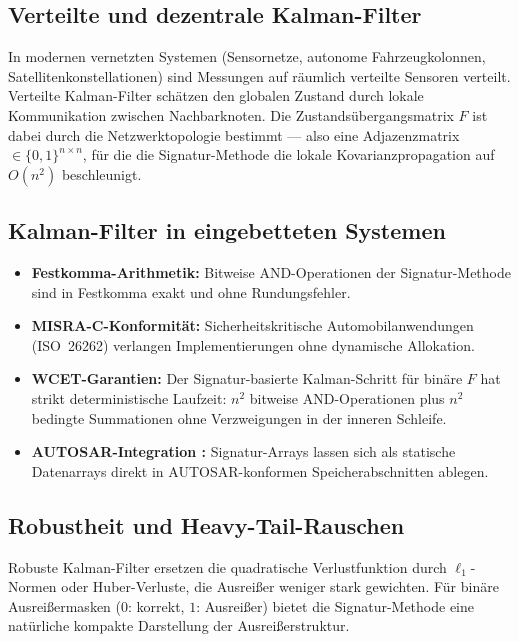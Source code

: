 ﻿\documentclass[a4paper,12pt]{article}
\theoremstyle{definition}
\begin{document}
\subsection{Verteilte und dezentrale Kalman-Filter}

In modernen vernetzten Systemen (Sensornetze, autonome Fahrzeugkolonnen,
Satellitenkonstellationen) sind Messungen auf räumlich verteilte Sensoren verteilt.
Verteilte Kalman-Filter \cite{olfati2007} schätzen den globalen Zustand durch lokale
Kommunikation zwischen Nachbarknoten. Die Zustandsübergangsmatrix $F$ ist dabei durch
die Netzwerktopologie bestimmt --- also eine Adjazenzmatrix $\in \{0,1\}^{n\times n}$,
für die die Signatur-Methode die lokale Kovarianzpropagation auf $O(n^2)$ beschleunigt.

\subsection{Kalman-Filter in eingebetteten Systemen}

\begin{itemize}
    \item \textbf{Festkomma-Arithmetik:} Bitweise AND-Operationen der Signatur-Methode
          sind in Festkomma exakt und ohne Rundungsfehler.
    \item \textbf{MISRA-C-Konformität:} Sicherheitskritische Automobilanwendungen
          (ISO~26262) verlangen Implementierungen ohne dynamische Allokation.
    \item \textbf{WCET-Garantien:} Der Signatur-basierte Kalman-Schritt für
          binäre $F$ hat strikt deterministische Laufzeit: $n^2$ bitweise AND-Operationen
          plus $n^2$ bedingte Summationen ohne Verzweigungen in der inneren Schleife.
    \item \textbf{AUTOSAR-Integration \cite{autosar}:} Signatur-Arrays lassen sich als
          statische Datenarrays direkt in AUTOSAR-konformen Speicherabschnitten ablegen.
\end{itemize}

\subsection{Robustheit und Heavy-Tail-Rauschen}

Robuste Kalman-Filter \cite{gandhi2010} ersetzen die quadratische Verlustfunktion
durch $\ell_1$-Normen oder Huber-Verluste, die Ausreißer weniger stark gewichten.
Für binäre Ausreißermasken ($0$: korrekt, $1$: Ausreißer) bietet die Signatur-Methode
eine natürliche kompakte Darstellung der Ausreißerstruktur.
\end{document}
